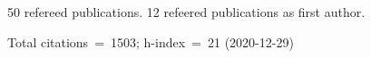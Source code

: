 50 refereed publications. 12 refeered publications as first author.

Total citations~=~1503; h-index~=~21 (2020-12-29)